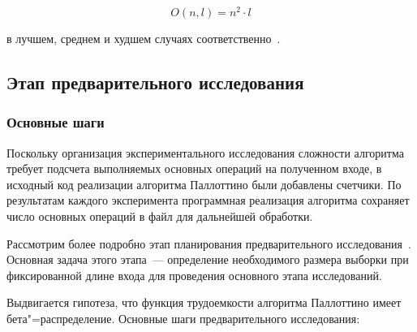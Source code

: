 \documentclass[a4paper, article, 14pt]{extarticle}
\begin{document}
\begin{equation}\label{eq:pallottino_worst}
	O(n, l) = n^2 \cdot l
\end{equation}

в лучшем, среднем и худшем случаях соответственно~\cite{pallottino}.

\subsection{Этап предварительного исследования}\label{sec:analysis_part_1}

\subsubsection{Основные шаги}\label{subsec:analysis_part_1_intro}

Поскольку организация экспериментального исследования сложности алгоритма требует подсчета выполняемых основных операций на полученном входе, в исходный код реализации алгоритма Паллоттино были добавлены счетчики. По результатам каждого эксперимента программная реализация алгоритма сохраняет число основных операций в файл для дальнейшей обработки.

Рассмотрим более подробно этап планирования предварительного исследования~\cite{petrushyn_ulyanov_planning}. Основная задача этого этапа~--- определение необходимого размера выборки при фиксированной длине входа для проведения основного этапа исследований.

Выдвигается гипотеза, что функция трудоемкости алгоритма Паллоттино имеет бета"=распределение. Основные шаги предварительного исследования:
\end{document}
